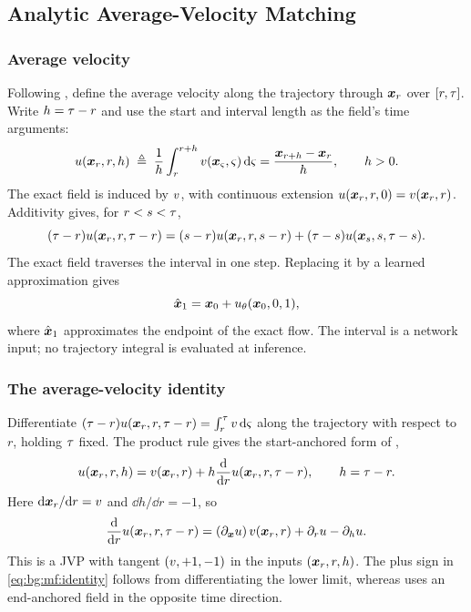 \subsection{Analytic Average-Velocity Matching}\label{sec:method:meanflow}

\subsubsection*{Average velocity}

Following \parencite[Eq.~(3)]{geng2025meanflow}, define the average velocity along the trajectory
through $\boldsymbol{x}_{r}$ over $[r,\tau]$. Write $h=\tau-r$ and use the start and interval length
as the field's time arguments:
\begin{equation}\label{eq:bg:mf:def}
  u(\boldsymbol{x}_{r},r,h)
  \;\triangleq\; \frac{1}{h}\int_{r}^{r+h}
      v(\boldsymbol{x}_{\varsigma},\varsigma)\,\mathrm{d}\varsigma
  = \frac{\boldsymbol{x}_{r+h}-\boldsymbol{x}_{r}}{h},\qquad h>0.
\end{equation}
The exact field is induced by $v$, with continuous extension
$u(\boldsymbol{x}_{r},r,0)=v(\boldsymbol{x}_{r},r)$. Additivity gives, for $r<s<\tau$,
\[
(\tau-r)u(\boldsymbol{x}_{r},r,\tau-r)
=(s-r)u(\boldsymbol{x}_{r},r,s-r)
 +(\tau-s)u(\boldsymbol{x}_{s},s,\tau-s).
\]
The exact field traverses the interval in one step. Replacing it by a learned approximation gives
\begin{equation}\label{eq:bg:mf:onestep}
  \hat{\boldsymbol{x}}_{1} = \boldsymbol{x}_{0}+u_{\theta}(\boldsymbol{x}_{0},0,1),
\end{equation}
where $\hat{\boldsymbol{x}}_{1}$ approximates the endpoint of the exact flow. The interval is a network
input; no trajectory integral is evaluated at inference.

\subsubsection*{The average-velocity identity}

Differentiate $(\tau-r)u(\boldsymbol{x}_{r},r,\tau-r)
=\int_{r}^{\tau}v\,\mathrm{d}\varsigma$ along the trajectory with respect to $r$, holding
$\tau$ fixed. The product rule gives the start-anchored form of
\parencite[Eqs.~(4)--(6)]{geng2025meanflow},
\begin{equation}\label{eq:bg:mf:identity}
  u(\boldsymbol{x}_{r},r,h)
  = v(\boldsymbol{x}_{r},r)+h\frac{\mathrm{d}}{\mathrm{d} r}
      u(\boldsymbol{x}_{r},r,\tau-r),\qquad h=\tau-r.
\end{equation}
Here $\mathrm{d}\boldsymbol{x}_{r}/\mathrm{d} r=v$ and $\dd h/\dd r=-1$, so
\begin{equation}\label{eq:bg:mf:jvp}
  \frac{\mathrm{d}}{\mathrm{d} r}u(\boldsymbol{x}_{r},r,\tau-r)
  = (\partial_{\boldsymbol{x}}u)\,v(\boldsymbol{x}_{r},r)
    +\partial_{r}u-\partial_{h}u.
\end{equation}
This is a \ac{JVP} with tangent $(v,+1,-1)$ in the inputs $(\boldsymbol{x}_{r},r,h)$.
The plus sign in \eqref{eq:bg:mf:identity} follows from differentiating the lower limit, whereas
\parencite[Eq.~(6)]{geng2025meanflow} uses an end-anchored field in the opposite time direction.

